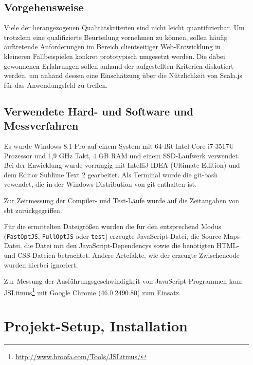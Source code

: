 \documentclass[a4paper, 12pt, hidelinks, listof=totoc, listoftables=totoc, bibliography=totoc]{scrreprt}
\newcommand{\code}[1]{\lstinline[language=Scala, style=inline]|#1|}
\begin{document}
\section{Vorgehensweise}

Viele der herangezogenen Qualitätskriterien sind nicht leicht quantifizierbar. Um trotzdem eine qualifizierte Beurteilung vornehmen zu können, sollen häufig auftretende Anforderungen im Bereich clientseitiger Web-Entwicklung in kleineren Fallbeispielen konkret prototypisch umgesetzt werden. Die dabei gewonnenen Erfahrungen sollen anhand der aufgestellten Kriterien diskutiert werden, um anhand dessen eine Einschätzung über die Nützlichkeit von Scala.js für das Anwendungsfeld zu treffen.


\section{Verwendete Hard- und Software und Messverfahren}

Es wurde Windows 8.1 Pro auf einem System mit 64-Bit Intel Core i7-3517U Prozessor und 1,9 GHz Takt, 4 GB RAM und einem SSD-Laufwerk verwendet. Bei der Enwicklung wurde vorrangig mit IntelliJ IDEA (Ultimate Edition) und dem Editor Sublime Text 2 gearbeitet. Als Terminal wurde die git-bash vewendet, die in der Windows-Distribution von git enthalten ist.

Zur Zeitmessung der Compiler- und Test-Läufe wurde auf die Zeitangaben von sbt zurückgegriffen.

Für die ermittelten Dateigrößen wurden die für den entsprechend Modus (\code{FastOptJS}, \code{FullOptJS} oder \code{test}) erzeugte JavaScript-Datei, die Source-Maps-Datei, die Datei mit den JavaScript-Dependencys sowie die benötigten \ac{HTML}- und CSS-Dateien betrachtet. Andere Artefakte, wie der erzeugte Zwischencode wurden hierbei ignoriert.

Zur Messung der Ausführungsgeschwindigkeit von JavaScript-Programmen kam JSLitmus\footnote{\url{http://www.broofa.com/Tools/JSLitmus/}} mit Google Chrome (46.0.2490.80) zum Einsatz.



\chapter{Projekt-Setup, Installation}\label{chap:setup}

\end{document}

